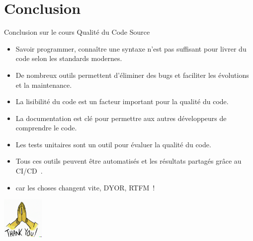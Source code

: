 \documentclass{beamer}
\begin{document}
    \section{Conclusion}
    \begin{frame}{Conclusion sur le cours Qualité du Code Source}
        \transdissolve
        \begin{itemize}
            \item Savoir programmer, connaître une syntaxe n'est pas suffisant pour livrer du code selon les standards modernes.
            \item De nombreux outils permettent d'éliminer des bugs et faciliter les évolutions et la maintenance.
            \item La lisibilité du code est un facteur important pour la qualité du code.
            \item La documentation est clé pour permettre aux autres développeurs de comprendre le code.
            \item Les tests unitaires sont un outil pour évaluer la qualité du code.
            \item Tous ces outils peuvent être automatisés et les résultats partagés grâce au CI/CD~.
            \item {} car les choses changent vite, DYOR, RTFM~!
        \end{itemize}
        \centering
        \includegraphics[width=2cm]{image/prayer-hands-thank-you}
    \end{frame}
\end{document}
